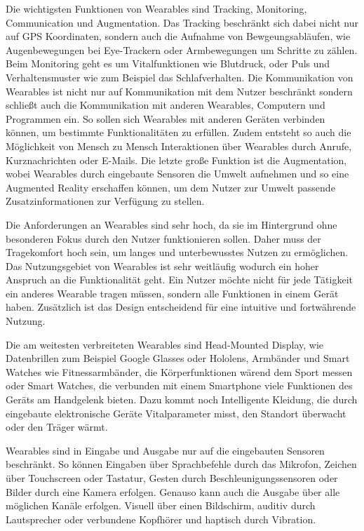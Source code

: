 \documentclass[ngerman,runningheads,a4paper]{llncs}
\begin{document}
Die wichtigsten Funktionen von Wearables sind Tracking, Monitoring, Communication und Augmentation. Das Tracking beschränkt sich dabei nicht nur auf GPS Koordinaten, sondern auch die Aufnahme von Bewgeungsabläufen, wie Augenbewegungen bei Eye-Trackern oder Armbewegungen um Schritte zu zählen. Beim Monitoring geht es um Vitalfunktionen wie Blutdruck, oder Puls und Verhaltensmuster wie zum Beispiel das Schlafverhalten. Die Kommunikation von Wearables ist nicht nur auf Kommunikation mit dem Nutzer beschränkt sondern schließt auch die Kommunikation mit anderen Wearables, Computern und Programmen ein. So sollen sich Wearables mit anderen Geräten verbinden können, um bestimmte Funktionalitäten zu erfüllen. Zudem entsteht so auch die Möglichkeit von Mensch zu Mensch Interaktionen über Wearables durch Anrufe, Kurznachrichten oder E-Mails. Die letzte große Funktion ist die Augmentation, wobei Wearables durch eingebaute Sensoren die Umwelt aufnehmen und so eine Augmented Reality erschaffen können, um dem Nutzer zur Umwelt passende Zusatzinformationen zur Verfügung zu stellen.

Die Anforderungen an Wearables sind sehr hoch, da sie im Hintergrund ohne besonderen Fokus durch den Nutzer funktionieren sollen. Daher muss der Tragekomfort hoch sein, um langes und unterbewusstes Nutzen zu ermöglichen.
Das Nutzungsgebiet von Wearables ist sehr weitläufig wodurch ein hoher Anspruch an die Funktionalität geht. Ein Nutzer möchte nicht für jede Tätigkeit ein anderes Wearable tragen müssen, sondern alle Funktionen in einem Gerät haben.
Zusätzlich ist das Design entscheidend für eine intuitive und fortwährende Nutzung.

Die am weitesten verbreiteten Wearables sind Head-Mounted Display, wie Datenbrillen zum Beispiel Google Glasses oder Hololens, Armbänder und Smart Watches wie Fitnessarmbänder, die Körperfunktionen wärend dem Sport messen oder Smart Watches, die verbunden mit einem Smartphone viele Funktionen des Geräts am Handgelenk bieten. Dazu kommt noch Intelligente Kleidung, die durch eingebaute elektronische Geräte Vitalparameter misst, den Standort überwacht oder den Träger wärmt.

Wearables sind in Eingabe und Ausgabe nur auf die eingebauten Sensoren beschränkt. So können Eingaben über Sprachbefehle durch das Mikrofon, Zeichen über Touchscreen oder Tastatur, Gesten durch Beschleunigungssensoren oder Bilder durch eine Kamera erfolgen. Genauso kann auch die Ausgabe über alle möglichen Kanäle erfolgen. Visuell über einen Bildschirm, auditiv durch Lautsprecher oder verbundene Kopfhörer und haptisch durch Vibration.
\cite{kleine2016gesellschaftliche}
\end{document}
